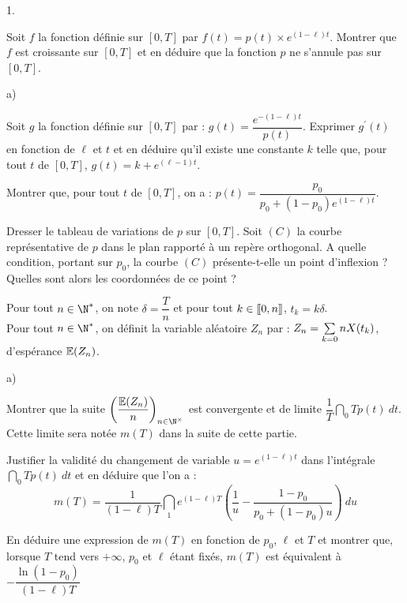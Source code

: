 \documentclass[11pt]{article}%
\begin{document}
\begin{noliste}{1.}
 \setlength{\itemsep}{4mm}
\item Soit $f$ la fonction définie sur $[0,T]$ par $f(t) = p(t) \times
e^{(1-\ell)t}$. Montrer que $f$ est croissante sur $[0,T]$ et en
déduire que
la fonction $p$ ne s'annule pas sur $[0,T]$.

\item 

\begin{noliste}{a)}
 \setlength{\itemsep}{2mm}
\item Soit $g$ la fonction définie sur $[0,T]$ par : $g(t) =
\dfrac{e^{-(1-\ell )t}}{p(t)}$. \quad Exprimer $g^{\prime }(t)$ en
fonction de $\ell $ et $t$ et en déduire qu'il existe une constante $k$
telle que, pour tout $t$ de $[0,T]$, \quad $g(t) = k + e^{(\ell -1)t}$.

\item Montrer que, pour tout $t$ de $[0,T]$, on a : $p(t) =
\dfrac{p_{0}}{p_{0} + (1-p_{0})e^{(1-\ell )t}}$.

\item Dresser le tableau de variations de $p$ sur $[0,T]$. Soit $(C)$
la
courbe représentative de $p$ dans le plan rapporté à un repère
orthogonal. A
quelle condition, portant sur $p_{0}$, la courbe $(C)$ présente-t-elle
un
point d'inflexion ? Quelles sont alors les coordonnées de ce point ?
\end{noliste}

\item Pour tout $n\in \N^{\ast }$, on note $\delta = \dfrac{T}{n}$ et
pour tout $k\in \lbrack \hspace{-0.15em}[0,n]\hspace{-0.13em}]$, $t_{k}
= k\delta $.\\
Pour tout $n\in \N^{\ast }$, on définit la variable aléatoire $Z_{n}$
par : $Z_{n} = \sum\limits_{k = 0}{n}X(t_{k})$, d'espérance
$\mathbb{E}(Z_{n})$.

\begin{noliste}{a)}
 \setlength{\itemsep}{2mm}
\item Montrer que la suite $\left( \dfrac{\E(Z_{n})}{n}\right)_{n\in
\N^{\times }}$ est convergente et de limite
$\dfrac{1}{T}\dint_{0}{T}p(t)\ dt$. Cette limite sera notée $m(T)$ dans
la suite de cette partie.

\item Justifier la validité du changement de variable $u = e^{(1-\ell
)t}$
dans l'intégrale $\dint\limits_{0}{T}p(t)\ dt$ et en déduire que l'on a
: 
\[
m(T) = \dfrac{1}{(1-\ell )T}\dint\limits_{1}{e^{(1-\ell )T}}\left(
\dfrac{1}{u}-\dfrac{1-p_{0}}{p_{0} + (1-p_{0})u}\right) \ du
\]

\item En déduire une expression de $m(T)$ en fonction de $p_{0}$, $\ell
$ et 
$T$ et montrer que, lorsque $T$ tend vers $ + \infty $, $p_{0}$ et
$\ell $ étant fixés, $m(T)$ est équivalent à $-\dfrac{\ln
(1-p_{0})}{(1-\ell )T}$
\end{noliste}
\end{noliste}
\end{document}
